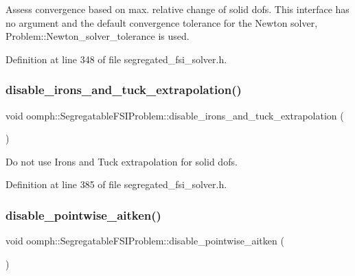 Assess convergence based on max. relative change of solid dofs. This interface has no argument and the default convergence tolerance for the Newton solver, Problem\+::\+Newton\+\_\+solver\+\_\+tolerance is used. 



Definition at line 348 of file segregated\+\_\+fsi\+\_\+solver.\+h.

\mbox{\label{classoomph_1_1SegregatableFSIProblem_a7f0bee5113993bf9b4ce4ab846f49c0a}} 
\subsubsection{\texorpdfstring{disable\+\_\+irons\+\_\+and\+\_\+tuck\+\_\+extrapolation()}{disable\_irons\_and\_tuck\_extrapolation()}}
{\footnotesize\ttfamily void oomph\+::\+Segregatable\+F\+S\+I\+Problem\+::disable\+\_\+irons\+\_\+and\+\_\+tuck\+\_\+extrapolation (\begin{DoxyParamCaption}{ }\end{DoxyParamCaption})\hspace{0.3cm}{\ttfamily [inline]}}



Do not use Irons and Tuck extrapolation for solid dofs. 



Definition at line 385 of file segregated\+\_\+fsi\+\_\+solver.\+h.

\mbox{\label{classoomph_1_1SegregatableFSIProblem_a34c040b6fe4860ad44bc48ddf859e9fe}} 
\subsubsection{\texorpdfstring{disable\+\_\+pointwise\+\_\+aitken()}{disable\_pointwise\_aitken()}}
{\footnotesize\ttfamily void oomph\+::\+Segregatable\+F\+S\+I\+Problem\+::disable\+\_\+pointwise\+\_\+aitken (\begin{DoxyParamCaption}{ }\end{DoxyParamCaption})\hspace{0.3cm}{\ttfamily [inline]}}



